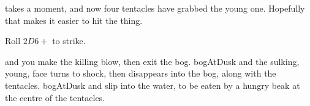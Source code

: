 takes a moment, and now four tentacles have grabbed the young one.
Hopefully that makes it easier to hit the thing.

Roll $2D6 + $  to strike.

\begin{selectPath}
  {and you make the killing blow, then exit the bog.}%
  {bogAtDusk}
  {and the sulking, young, face turns to shock, then disappears into the bog, along with the tentacles.}%
  {bogAtDusk}
  {and slip into the water, to be eaten by a hungry beak at the centre of the tentacles.}%
  {}
\end{selectPath}

